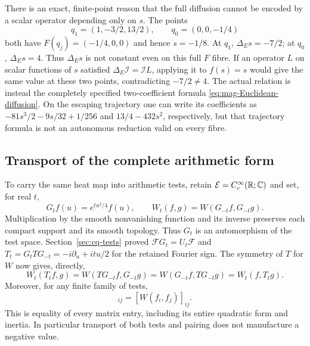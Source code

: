 There is an exact, finite-point reason that the full diffusion cannot
be encoded by a scalar operator depending only on $s$. The points
\[
 q_1=(1,-3/2,13/2),\qquad q_0=(0,0,-1/4)
\]
both have $F(q_j)=(-1/4,0,0)$ and hence $s=-1/8$.
At $q_1$, $\Delta_Es=-7/2$; at $q_0$, $\Delta_Es=4$.
Thus $\Delta_Es$ is not constant even on this full $F$ fibre.
If an operator $L$ on scalar functions of $s$ satisfied
$\Delta_E\mathcal I=\mathcal I L$, applying it to $f(s)=s$
would give the same value at these two points, contradicting
$-7/2\ne4$. The actual relation is instead the completely specified
two-coefficient formula \eqref{eq:mag-Euclidean-diffusion}.
On the escaping trajectory one can write its coefficients as
$-81s^3/2-9s/32+1/256$ and $13/4-432s^2$, respectively,
but that trajectory formula is not an autonomous reduction valid
on every fibre.

\subsection{Transport of the complete arithmetic form}

To carry the same heat map into arithmetic tests, retain
$\mathcal E=C_c^\infty(\mathbb R;\mathbb C)$ and set, for real $t$,
\[
 G_tf(u)=e^{tu^2/4}f(u),\qquad
 W_t(f,g)=W(G_{-t}f,G_{-t}g).
\]
Multiplication by the smooth nonvanishing function and its inverse
preserves each compact support and its smooth topology. Thus $G_t$
is an automorphism of the test space. Section~\ref{sec:cq-tests}
proved $\mathcal F G_t=U_t\mathcal F$ and
$T_t=G_tTG_{-t}=-i\partial_u+itu/2$ for the retained Fourier sign.
The symmetry of $T$ for $W$ now gives, directly,
\[
 W_t(T_tf,g)
 =W(TG_{-t}f,G_{-t}g)
 =W(G_{-t}f,TG_{-t}g)=W_t(f,T_tg).
\]
Moreover, for any finite family of tests,
\begin{equation}
 [W_t(G_tf_i,G_tf_j)]_{ij}=[W(f_i,f_j)]_{ij}.
 \label{eq:mag-Weil-congruence}
\end{equation}
This is equality of every matrix entry, including its entire quadratic
form and inertia. In particular transport of both tests and pairing
does not manufacture a negative value.

